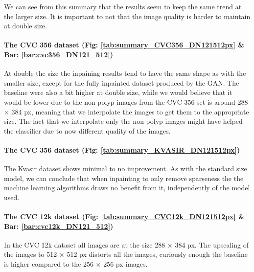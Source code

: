 We can see from this summary that the results seem to keep the same trend at the larger size.
It is important to not that the image quality is harder to maintain at double size.


\paragraph{The CVC 356 dataset (Fig: \ref{tab:summary_CVC356_DN121512px} \& Bar: \ref{bar:cvc356_DN121_512})}
At double the size the inpaining results tend to have the same shape as with the smaller size, except for the fully inpainted dataset produced by the GAN.  The baseline were also a bit higher at double size, while we would believe that it would be lower due to the non-polyp images from the CVC 356 set is around 288 $\times$ 384 px, meaning that we interpolate the images to get them to the appropriate size. The fact that we interpolate only the non-polyp images might have helped the classifier due to now different quality of the images.

\paragraph{The CVC 356 dataset (Fig: \ref{tab:summary_KVASIR_DN121512px})}
The Kvasir dataset shows minimal to no improvement. As with the standard size model, we can conclude that when inpainting to only remove sparseness the the machine learning algorithms draws no benefit from it, independently of the model used.

\paragraph{The CVC 12k dataset (Fig: \ref{tab:summary_CVC12k_DN121512px} \& Bar: \ref{bar:cvc12k_DN121_512})}
In the CVC 12k dataset all images are at the size 288 $\times$ 384 px. The upscaling of the images to 512 $\times$ 512 px distorts all the images, curiously enough the baseline is higher compared to the 256 $\times$ 256 px images.






